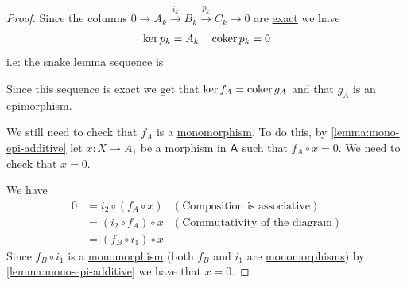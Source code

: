 \documentclass[../../../main]{subfiles}
\begin{document}
\begin{proof}
  Since the columns \(0 \to A_{k} \xrightarrow{i_{k}} B_{k} \xrightarrow{p_{k}} C_{k} \to 0\) are \hyperref[def:short-exact-sequence]{exact} we have
  \begin{align*}
    \ker p_{k} = A_{k} \quad \operatorname*{coker} p_{k} = 0 
  \end{align*}
  i.e: the snake lemma sequence is
  \begin{center}
  \end{center}
  Since this sequence is exact we get that \(\ker f_{A} = \operatorname*{coker} g_{A}\) and that \(g_{A}\) is an \hyperref[def:mono-epi-morphism]{epimorphism}.

  We still need to check that \(f_{A}\) is a \hyperref[def:mono-epi-morphism]{monomorphism}.
  To do this, by \autoref{lemma:mono-epi-additive} let \(x: X \to A_{1}\) be a morphism in \(\mathsf{A}\) such that \(f_{A} \circ x = 0\).
  We need to check that \(x = 0\).

  We have
  \begin{align*}
    0 &= i_{2} \circ (f_{A} \circ x) & \left( \text{Composition is associative} \right) \\
      &= (i_{2} \circ f_{A}) \circ x & \left( \text{Commutativity of the diagram} \right) \\
      &= (f_{B} \circ i_{1}) \circ x
  \end{align*}
  Since \(f_{B} \circ i_{1}\) is a \hyperref[def:mono-epi-morphism]{monomorphism} (both \(f_{B}\) and \(i_{1}\) are \hyperref[def:mono-epi-morphism]{monomorphisms}) by \autoref{lemma:mono-epi-additive} we have that \(x = 0\).
\end{proof}
\end{document}
